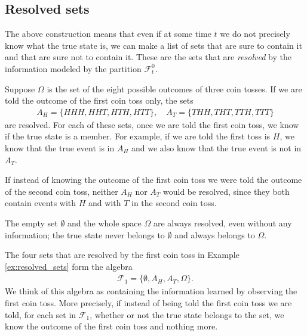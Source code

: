 \documentclass[\topdir/lecture\_notes.tex]{subfiles}
\begin{document}
\begin{optional}
\subsection{Resolved sets}
The above construction means that even if at some time $t$ we do not precisely know what the true state is, we can make a list of sets that are sure to contain it and that are sure not to contain it. These are the sets that are \emph{resolved} by the information modeled by the partition $\mathcal{F}_{t}^{0}$.

\begin{example}\label{ex:resolved_sets}
Suppose $\Omega$ is the set of the eight possible outcomes of three coin tosses. If we are told the outcome of the first coin toss only, the sets
\begin{align*}
A_{H}=\{H H H, H H T, H T H, H T T\}, \quad A_{T}=\{T H H, T H T, T T H, T T T\}
\end{align*}
are resolved. For each of these sets, once we are told the first coin toss, we know if the true state is a member. For example, if we are told the first toss is $H$, we know that the true event is in $A_{H}$ and we also know that the true event is not in $A_{T}$.

If instead of knowing the outcome of the first coin toss we were told the outcome of the second coin toss, neither $A_{H}$ nor $A_{T}$ would be resolved, since they both contain events with $H$ and with $T$ in the second coin toss.
\end{example}

The empty set $\emptyset$ and the whole space $\Omega$ are always resolved, even without any information; the true state never belongs to $\emptyset$ and always belongs to $\Omega$. 

\begin{example}
The four sets that are resolved by the first coin toss in Example \ref{ex:resolved_sets} form the algebra
\begin{align*}
\mathcal{F}_{1}=\{\emptyset, A_{H}, A_{T}, \Omega \}.
\end{align*}
We think of this algebra as containing the information learned by observing the first coin toss. More precisely, if instead of being told the first coin toss we are told, for each set in $\mathcal{F}_{1}$, whether or not the true state belongs to the set, we know the outcome of the first coin toss and nothing more.


\end{example}
\end{optional}
\end{document}
